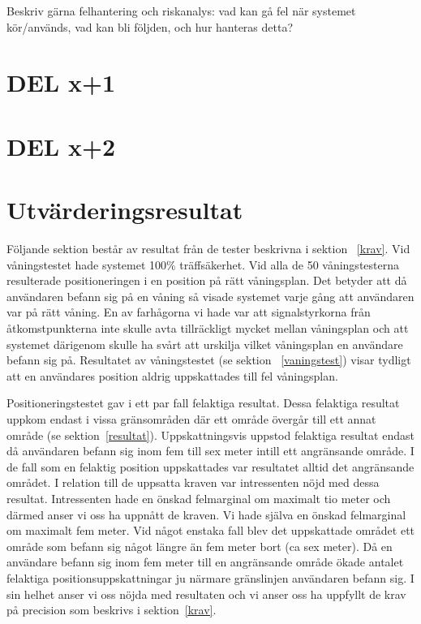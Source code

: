 \documentclass[a4paper,12pt]{article}
\begin{document}
 Beskriv gärna felhantering och riskanalys: vad kan gå fel när systemet kör/används, vad kan bli följden, och hur hanteras detta?

 \section{DEL x+1}
 \section{DEL x+2}

 \fi

 \section{Utvärderingsresultat}\label{utvarderingsresultat}

 Följande sektion består av resultat från de tester beskrivna i sektion ~\ref{krav}.
 Vid våningstestet hade systemet 100\% träffsäkerhet. Vid alla de 50 våningstesterna resulterade positioneringen i en position på rätt våningsplan. Det betyder att då användaren befann sig på en våning så visade systemet varje gång att användaren var på rätt våning. En av farhågorna vi hade var att signalstyrkorna från åtkomstpunkterna inte skulle avta tillräckligt mycket mellan våningsplan och att systemet därigenom skulle ha svårt att urskilja vilket våningsplan en användare befann sig på. Resultatet av våningstestet (se sektion ~\ref{vaningstest}) visar tydligt att en användares position aldrig uppskattades till fel våningsplan.

 Positioneringstestet gav i ett par fall felaktiga resultat. Dessa felaktiga resultat uppkom endast i vissa gränsområden där ett område övergår till ett annat område (se sektion~\ref{resultat}). Uppskattningsvis uppstod felaktiga resultat endast då användaren befann sig inom fem till sex meter intill ett angränsande område. I de fall som en felaktig position uppskattades var resultatet alltid det angränsande området. I relation till de uppsatta kraven var intressenten nöjd med dessa resultat. Intressenten hade en önskad felmarginal om maximalt tio meter och därmed anser vi oss ha uppnått de kraven. Vi hade själva en önskad felmarginal om maximalt fem meter. Vid något enstaka fall blev det uppskattade området ett område som befann sig något längre än fem meter bort (ca sex meter). Då en användare befann sig inom fem meter till en angränsande område ökade antalet felaktiga positionsuppskattningar ju närmare gränslinjen användaren befann sig. I sin helhet anser vi oss nöjda med resultaten och vi anser oss ha uppfyllt de krav på precision som beskrivs i sektion~\ref{krav}.
\end{document}
